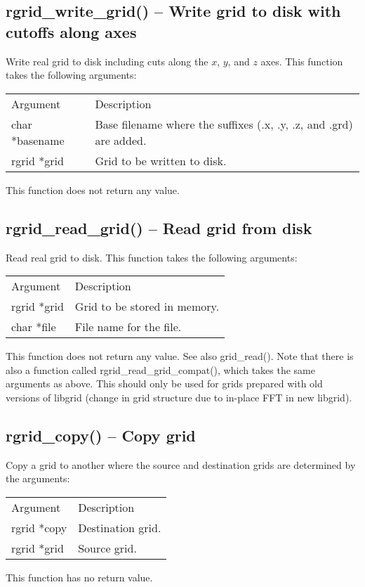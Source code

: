 \documentclass[12pt,letterpaper]{report}
\begin{document}
\subsection{rgrid\_write\_grid() -- Write grid to disk with cutoffs along axes}

Write real grid to disk including cuts along the $x$, $y$, and $z$ axes. This function takes the following arguments:
\begin{longtable}{p{} p{}}
Argument & Description\\
\cline{1-2}
char *basename & Base filename where the suffixes (.x, .y, .z, and .grd) are added.\\
rgrid *grid & Grid to be written to disk.\\
\end{longtable}
\noindent
This function does not return any value.

\subsection{rgrid\_read\_grid() -- Read grid from disk}

Read real grid to disk. This function takes the following arguments:
\begin{longtable}{p{} p{}}
Argument & Description\\
\cline{1-2}
rgrid *grid & Grid to be stored in memory.\\
char *file & File name for the file.\\
\end{longtable}
\noindent
This function does not return any value. See also grid\_read(). Note that there is also a function called rgrid\_read\_grid\_compat(), which takes the same arguments as above. This should only be used for grids prepared with old versions of libgrid (change in grid structure due to in-place FFT in new libgrid).

\subsection{rgrid\_copy() -- Copy grid}

Copy a grid to another where the source and destination grids are determined by the arguments:
\begin{longtable}{p{} p{}}
Argument & Description\\
\cline{1-2}
rgrid *copy & Destination grid.\\
rgrid *grid & Source grid.\\
\end{longtable}
\noindent
This function has no return value.
\end{document}
